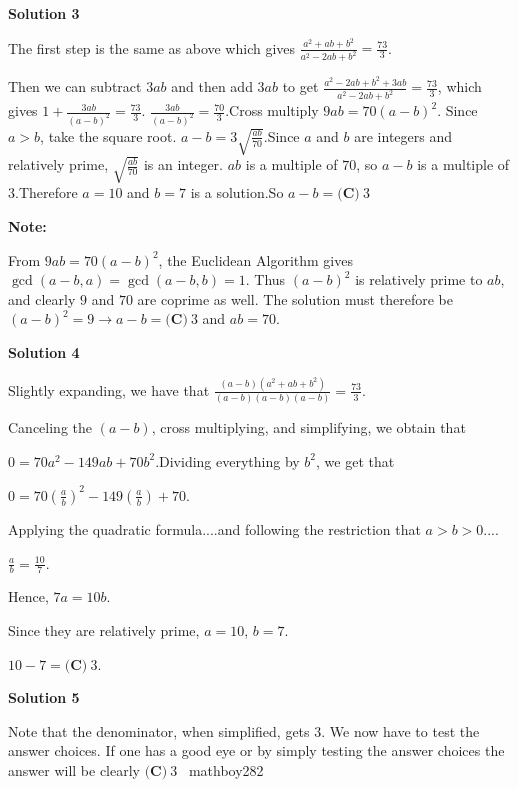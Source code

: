 \begin{enumerate}
 



\textbf{Solution 3}

The first step is the same as above which gives $\frac{a^2+ab+b^2}{a^2-2ab+b^2}=\frac{73}{3}$.

 Then we can subtract $3ab$ and then add $3ab$ to get $\frac{a^2-2ab+b^2+3ab}{a^2-2ab+b^2}=\frac{73}{3}$, which gives $1+\frac{3ab}{(a-b)^2}=\frac{73}{3}$. $\frac{3ab}{(a-b)^2}=\frac{70}{3}$.Cross multiply $9ab=70(a-b)^2$. Since $a>b$, take the square root. $a-b=3\sqrt{\frac{ab}{70}}$.Since $a$ and $b$ are integers and relatively prime, $\sqrt{\frac{ab}{70}}$ is an integer. $ab$ is a multiple of $70$, so $a-b$ is a multiple of $3$.Therefore $a=10$ and $b=7$ is a solution.So $a-b=\boxed{\textbf{(C)}\ 3}$

 \textbf{Note:}

 From $9ab=70(a-b)^2$, the Euclidean Algorithm gives $\gcd(a-b,a)=\gcd(a-b,b)=1$. Thus $(a-b)^2$ is relatively prime to $ab$, and clearly $9$ and $70$ are coprime as well. The solution must therefore be $(a-b)^2=9 \rightarrow a-b=\boxed{\textbf{(C)}\ 3}$ and $ab=70$.

 



\textbf{Solution 4}

Slightly expanding, we have that $\frac{(a-b)(a^2+ab+b^2)}{(a-b)(a-b)(a-b)}=\frac{73}{3}$.

 Canceling the $(a-b)$, cross multiplying, and simplifying, we obtain that

 $0=70a^2-149ab+70b^2$.Dividing everything by $b^2$, we get that

 $0=70\left(\frac{a}{b}\right)^2-149\left(\frac{a}{b} \right)+70$.

 Applying the quadratic formula....and following the restriction that $a>b>0$....

 $\frac{a}{b}=\frac{10}{7}$.

 Hence, $7a=10b$.

 Since they are relatively prime, $a=10$, $b=7$.

 $10-7=\boxed{\textbf{(C)}\ 3}$.

 



\textbf{Solution 5}

Note that the denominator, when simplified, gets $3.$ We now have to test the answer choices. If one has a good eye or by simply testing the answer choices the answer will be clearly $\boxed{\textbf{(C)}\ 3}$ ~mathboy282


\end{enumerate}
